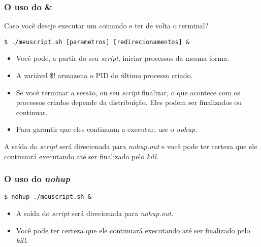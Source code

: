 \documentclass{beamer}
\begin{document}
   \begin{frame}[fragile]
      \frametitle{O uso do \&}
      Caso você deseje executar um comando e ter de volta o terminal?
      \begin{verbatim}
$ ./meuscript.sh [parametros] [redirecionamentos] &
      \end{verbatim}
      \begin{itemize}
         \item Você pode, a partir do seu \textit{script}, iniciar processos da mesma forma.
         \item A variável \$! armazena o PID do último processo criado. 
         \item Se você terminar a sessão, ou seu \textit{script} finalizar, o que acontece com os processos criados depende da distribuição. Eles podem ser finalizados ou continuar. 
         \item Para garantir que eles continuam a executar, use o \textit{nohup}. 
      \end{itemize}   
      A saída do \textit{script} será direcionada para \textit{nohup.out} e você pode ter certeza que ele continuará executando até ser finalizado pelo \textit{kill}.
\end{frame}

\begin{frame}[fragile]
   \frametitle{O uso do \textit{nohup}}
   \begin{verbatim}
$ nohup ./meuscript.sh &
   \end{verbatim} 
   \begin{itemize}
      \item  A saída do \textit{script} será direcionada para \textit{nohup.out}.
      \item Você pode ter certeza que ele continuará executando até ser finalizado pelo \textit{kill}.
   \end{itemize}
\end{frame}
\end{document}
